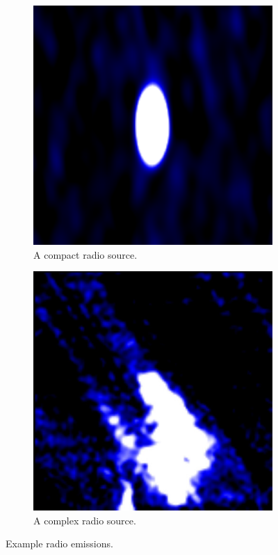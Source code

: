 \documentclass[a4paper]{article}
\begin{document}
      \begin{figure}[!ht]
        \centering
          \begin{subfigure}{0.3\textwidth}
            \includegraphics[width=\linewidth]{images/ARG0003r22_radio.png}
            \caption{A compact radio source.}
            \label{fig:compact-source}
          \end{subfigure}
          \quad
          \begin{subfigure}{0.3\textwidth}
            \includegraphics[width=\linewidth]{images/ARG0002dun_radio.jpg}
            \caption{A complex radio source.}
            \label{fig:complex-source}
          \end{subfigure}
          \caption{Example radio emissions.}
      \end{figure}
\end{document}
